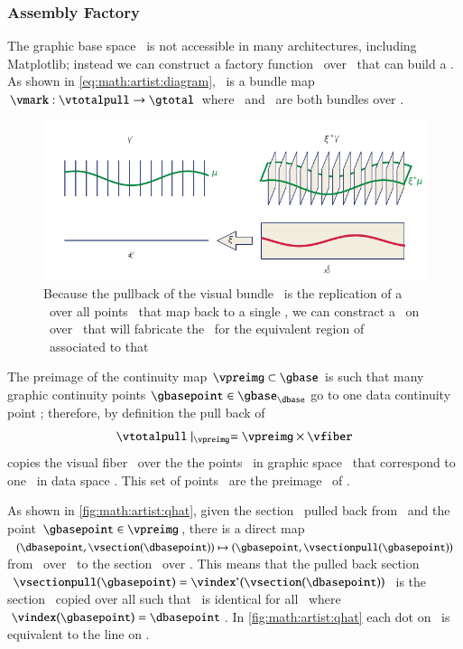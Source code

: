\documentclass[journal]{vgtc}                %
\begin{document}
\subsubsection{Assembly Factory}
\label{sec:math:artist:qhat}
The graphic base space \gbase\ is not accessible in many architectures, including Matplotlib; instead we can construct a factory function \vmarkd\ over \dbase\ that can build a \vmark. As shown in \autoref{eq:math:artist:diagram}, \vmark\ is a bundle map $\vmark: \vtotalpull\rightarrow \gtotal$ where \vtotalpull\ and \gtotal\ are both bundles over \gbase.
\begin{figure}[htb]
  \centering
    \includegraphics[width=1\columnwidth]{q_hat.png}
    \caption{Because the pullback of the visual bundle \vtotalpull\ is the replication of a \vsection\ over all points \gbasepoint\ that map back to a single \dbasepoint, we can constract a \vmarkd\ on \vsection\ over \dbasepoint\ that will fabricate the \vmark\ for the equivalent region of \gbasepoint\ associated to that \dbasepoint}
    \label{fig:math:artist:qhat}
\end{figure}

The preimage of the continuity map $\vpreimg \subset \gbase$ is such that many graphic continuity points $\gbasepoint \in \gbase_{\dbase}$ go to one data continuity point \dbasepoint; therefore, by definition the pull back of \vsection\
\begin{equation}
    \vtotalpull \mid_{\vpreimg} = \vpreimg \times \vfiber
\end{equation}
copies the visual fiber \vfiber\ over the the points \gbasepoint\ in graphic space \gbase\ that correspond to one \dbasepoint\ in data space \dbase. This set of points \gbasepoint\ are the preimage \vpreimg\ of \dbasepoint. 

As shown in \autoref{fig:math:artist:qhat}, given the section \vsectionpull\ pulled back from \vsection\ and the point $\gbasepoint \in \vpreimg$, there is a direct map $(\dbasepoint, \vsection(\dbasepoint)) \mapsto (\gbasepoint, \vsectionpull(\gbasepoint))$  from \vsection\ over \dbasepoint\ to the section \vsectionpull\ over \gbasepoint. This means that the pulled back section $\vsectionpull(\gbasepoint) = \vindex^*(\vsection(\dbasepoint))$ is the section \vsection\ copied over all \gbasepoint such that \vsectionpull\ is identical for all \gbasepoint\ where $\vindex(\gbasepoint) = \dbasepoint$. In \autoref{fig:math:artist:qhat} each dot on \vfiber\ is equivalent to the line on \vfiberpull. 
\end{document}
